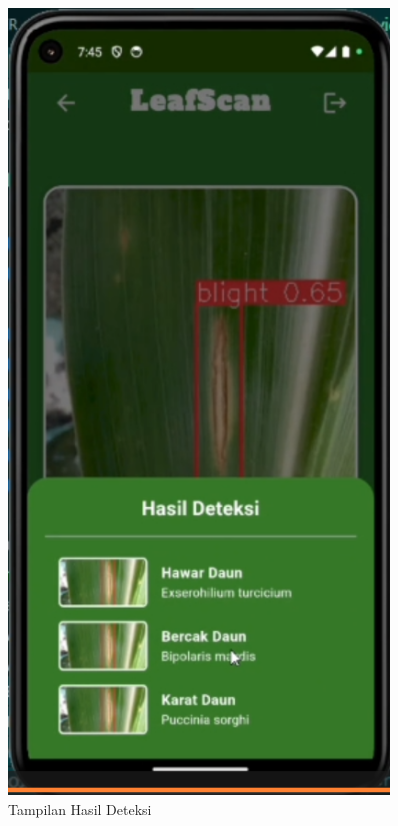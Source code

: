 \documentclass[journal,article,submit,pdftex,moreauthors]{Definitions/mdpi}
\begin{document}
\begin{itemize}
\begin{itemize}
        \begin{figure}[H]
            \centering
            \begin{minipage}{0.3\textwidth}
                \centering
                \includegraphics[width=0.9\textwidth]{Images/hasil_deteksi.png}
                \caption{Tampilan Hasil Deteksi}
                \label{fig:detection-view}
           \end{minipage}

\end{figure}
\end{itemize}
\end{itemize}
\end{document}
